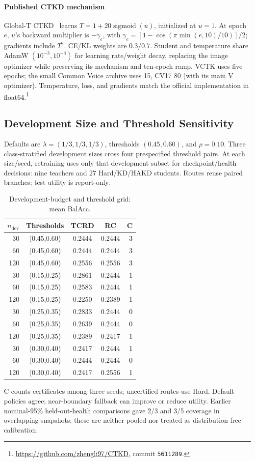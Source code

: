 \documentclass[journal]{IEEEtran}
\begin{document}
\paragraph*{Published CTKD mechanism}
Global-T CTKD~\cite{li2023ctkd} learns $T=1+20\operatorname{sigmoid}(u)$, initialized at $u=1$. At epoch $e$, $u$'s backward multiplier is $-\gamma_e$, with $\gamma_e=[1-\cos(\pi\min(e,10)/10)]/2$; gradients include $T^2$. CE/KL weights are $0.3/0.7$. Student and temperature share AdamW $(10^{-3},10^{-4})$ for learning rate/weight decay, replacing the image optimizer while preserving its mechanism and ten-epoch ramp. VCTK uses five epochs; the small Common Voice archive uses 15, CV17 80 (with its main V optimizer). Temperature, loss, and gradients match the official implementation in float64.\footnote{\url{https://github.com/zhengli97/CTKD}, commit \texttt{5611289}.}

\subsection{Development Size and Threshold Sensitivity}
Defaults are $\lambda=(1/3,1/3,1/3)$, thresholds $(0.45,0.60)$, and $\rho=0.10$. Three class-stratified development sizes cross four prespecified threshold pairs. At each size/seed, retraining uses only that development subset for checkpoint/health decisions: nine teachers and 27 Hard/KD/HAKD students. Routes reuse paired branches; test utility is report-only.
\begin{table}[t]
\centering\footnotesize\setlength{\tabcolsep}{3pt}
\caption{Development-budget and threshold grid: mean BalAcc.}
\label{tab:devsize}
\begin{tabular}{rcccr}\toprule
$n_{\mathrm{dev}}$ & Thresholds & TCRD & RC & C\\\midrule
30 & (0.45,0.60)&0.2444&0.2444&3\\
60 & (0.45,0.60)&0.2444&0.2444&3\\
120 & (0.45,0.60)&0.2556&0.2556&3\\\midrule
30 & (0.15,0.25)&0.2861&0.2444&1\\
60 & (0.15,0.25)&0.2583&0.2444&1\\
120 & (0.15,0.25)&0.2250&0.2389&1\\\midrule
30 & (0.25,0.35)&0.2833&0.2444&0\\
60 & (0.25,0.35)&0.2639&0.2444&0\\
120 & (0.25,0.35)&0.2389&0.2417&1\\\midrule
30 & (0.30,0.40)&0.2417&0.2444&1\\
60 & (0.30,0.40)&0.2444&0.2444&0\\
120 & (0.30,0.40)&0.2417&0.2556&1\\\bottomrule
\end{tabular}
\end{table}
C counts certificates among three seeds; uncertified routes use Hard. Default policies agree; near-boundary fallback can improve or reduce utility. Earlier nominal-95\% held-out-health comparisons gave 2/3 and 3/5 coverage in overlapping snapshots; these are neither pooled nor treated as distribution-free calibration.
\end{document}
